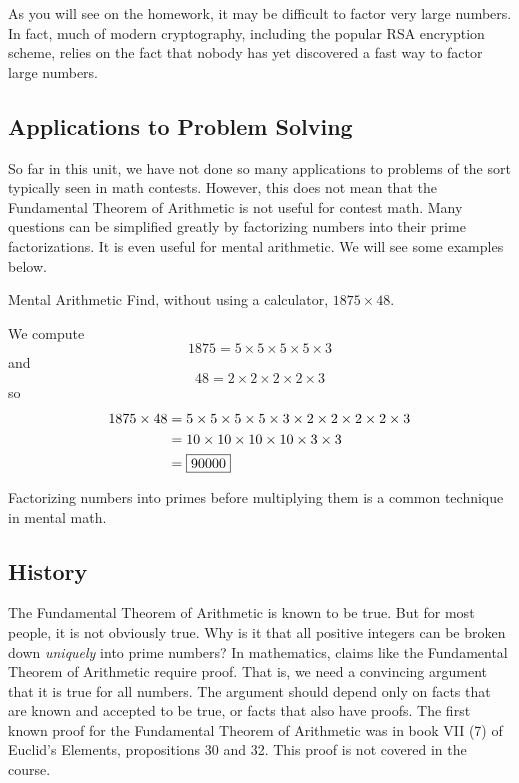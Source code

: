 \documentclass[a4paper,10pt]{report}
\begin{document}
As you will see on the homework, it may be difficult to factor very large
numbers. In fact, much of modern cryptography, including the popular RSA
encryption scheme, relies on the fact that nobody has yet discovered a fast way
to factor large numbers.

\subsection{Applications to Problem Solving}

So far in this unit, we have not done so many applications to problems of the
sort typically seen in math contests. However, this does not mean that the
Fundamental Theorem of Arithmetic is not useful for contest math. Many questions
can be simplified greatly by factorizing numbers into their prime
factorizations. It is even useful for mental arithmetic. We will see some
examples below.

\begin{problem}{Mental Arithmetic}
 Find, without using a calculator, $1875\times48$.

 \begin{solution}
  We compute \[
   1875 = 5 \times 5 \times 5 \times 5 \times 3
  \] and \[
   48 = 2 \times 2 \times 2 \times 2 \times 3
  \] so \begin{align*}
   1875 \times 48
   &= 5 \times 5 \times 5 \times 5 \times 3 \times 2 \times 2 \times 2 \times 2
   \times 3 \\
   &= 10 \times 10 \times 10 \times 10 \times 3 \times 3 \\
   &= \Ans{90000}
  \end{align*}

  Factorizing numbers into primes before multiplying them is a common technique
  in mental math.
 \end{solution}
\end{problem}

\subsection{History}

The Fundamental Theorem of Arithmetic is known to be true. But for most people,
it is not obviously true. Why is it that all positive integers can be broken
down \emph{uniquely} into prime numbers? In mathematics, claims like the
Fundamental Theorem of Arithmetic require proof. That is, we need a convincing
argument that it is true for all numbers. The argument should depend only on
facts that are known and accepted to be true, or facts that also have proofs.
The first known proof for the Fundamental Theorem of Arithmetic was in book VII
(7) of Euclid's Elements, propositions 30 and 32. This proof is not covered in
the course.
\end{document}
